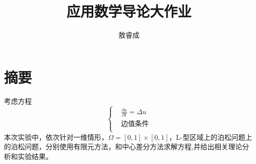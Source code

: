 \documentclass[12pt]{ctexart}
\begin{document}
	
\author{敖睿成}
\title{应用数学导论大作业}\date{}
\maketitle

\section{摘要}
考虑方程
$$\left\{
\begin{aligned}
&\frac{\partial u}{\partial t} = \Delta u\\
&\mbox{边值条件} \\
\end{aligned}
\right.$$
本次实验中，依次针对一维情形，$ \Omega = [0,1]\times [0,1]$，L-型区域上的泊松问题上的泊松问题，分别使用有限元方法，和中心差分方法求解方程,并给出相关理论分析和实验结果。
\end{document}
